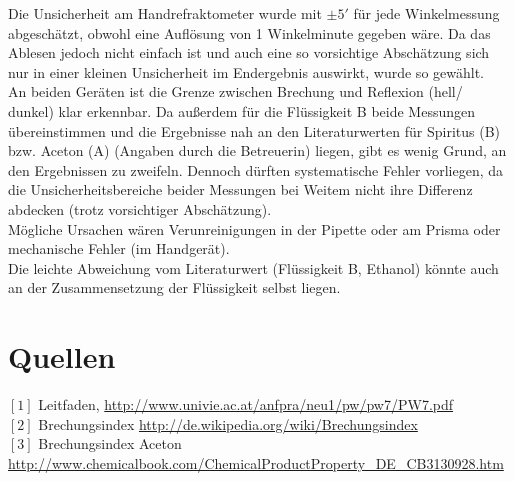\documentclass[12pt,a4paper]{article}
\begin{document}
\begin{multicols}{2}
Die Unsicherheit am Handrefraktometer wurde mit $\pm 5'$ für jede Winkelmessung abgeschätzt, obwohl eine Auflösung von 1 Winkelminute gegeben wäre. Da das Ablesen jedoch nicht einfach ist und auch eine so vorsichtige Abschätzung sich nur in einer kleinen Unsicherheit im Endergebnis auswirkt, wurde so gewählt.\\


An beiden Geräten ist die Grenze zwischen Brechung und Reflexion (hell/ dunkel) klar erkennbar. Da außerdem für die Flüssigkeit B beide Messungen übereinstimmen und die Ergebnisse nah an den Literaturwerten für Spiritus (B) bzw. Aceton (A) (Angaben durch die Betreuerin) liegen, gibt es wenig Grund, an den Ergebnissen zu zweifeln.
Dennoch dürften systematische Fehler vorliegen, da die Unsicherheitsbereiche beider Messungen bei Weitem nicht ihre Differenz abdecken (trotz vorsichtiger Abschätzung).\\
Mögliche Ursachen wären Verunreinigungen in der Pipette oder am Prisma oder mechanische Fehler (im Handgerät).\\
Die leichte Abweichung vom Literaturwert (Flüssigkeit B, Ethanol) könnte auch an der Zusammensetzung der Flüssigkeit selbst liegen.


\section{Quellen}
$[1]$ Leitfaden, \url{http://www.univie.ac.at/anfpra/neu1/pw/pw7/PW7.pdf}\\
$[2]$ Brechungsindex \url{http://de.wikipedia.org/wiki/Brechungsindex}\\
$[3]$ Brechungsindex Aceton \url{http://www.chemicalbook.com/ChemicalProductProperty_DE_CB3130928.htm}

\end{multicols}
\end{document}
